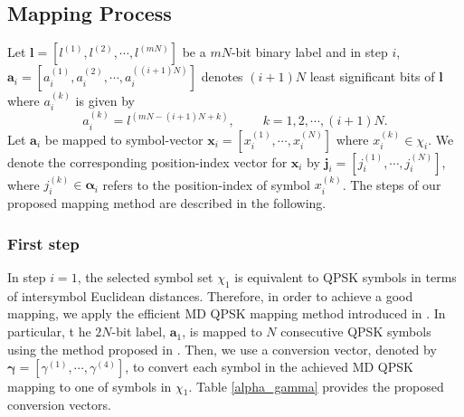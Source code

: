 \documentclass[12pt, draftclsnofoot, onecolumn]{IEEEtran}
\newcommand{\mb}[1]{\boldsymbol{#1}}
\begin{document}
  
  


\subsection{Mapping Process}

 Let ${\mb l}  = [l^{(1)}, l^{(2)}, \cdots, l^{(mN)}]$ be a $mN$-bit binary label and in step $i$, ${\mb a}_{i}=[ a^{(1)}_{i}, a^{(2)}_{i}, \cdots, a^{((i+1)N)}_{i}]$ denotes $(i+1)N$ least significant bits of ${\mb l}$ where $a^{(k)}_{i}$ is given by
\begin{equation}
a^{(k)}_{i} = l^{(mN-(i+1)N+k)},~~~~~~~~~~k=1,2,\cdots, (i+1)N.
\end{equation} 
% 
Let ${\mb a}_{i}$ be mapped to symbol-vector ${\mb x}_{i}=[x^{(1)}_{i}, \cdots, x^{(N)}_{i}]$ where $x^{(k)}_{i}\in {\chi}_i$. We denote the corresponding position-index vector for ${\mb x}_{i}$ by ${\mb j}_{i}=[j^{(1)}_{i}, \cdots, j^{(N)}_{i}]$, where $j^{(k)}_{i}\in {\mb \alpha}_{i}$ refers to the position-index of symbol $x^{(k)}_{i}$.   
The steps of our  proposed mapping method are described in the following. 
\subsubsection{First step} 
In step $i=1$,  the selected symbol set $\chi_1$   is  equivalent to  QPSK symbols in terms of intersymbol  Euclidean distances. 
 Therefore, in order to achieve a good mapping, we apply the efficient MD QPSK mapping method introduced in \cite{MD-BQPSK-Simoen}. In particular,  t\color{black} he $2N$-bit label, $\mb{a}_{1}$, is mapped to $N$ consecutive QPSK symbols using the method proposed in \cite{MD-BQPSK-Simoen}. \color{black} Then, we use a  conversion vector, denoted by $\mb{\gamma} = [\gamma^{(1)}, \cdots, \gamma^{(4)}]$, to convert each symbol in the achieved MD QPSK mapping to one of symbols in $\chi{_1}$. Table \ref{alpha_gamma} provides the proposed conversion vectors. %
 
\end{document}
